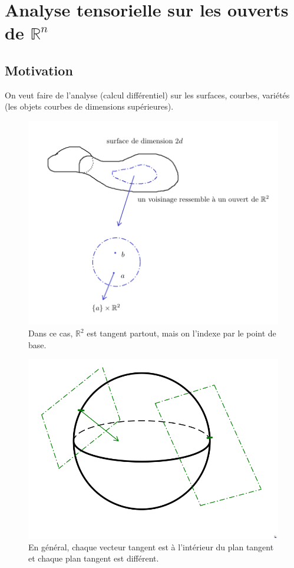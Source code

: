 \documentclass[french]{article}
\theoremstyle{definition}
\begin{document}
\section{Analyse tensorielle sur les ouverts de \(\mathbb{R}^n\)}

\subsection{Motivation}

On veut faire  de l'analyse (calcul différentiel) sur les surfaces, courbes, variétés (les objets courbes de dimensions supérieures).


\begin{figure}[h!]
  \centering
  \includegraphics[scale=0.3]{figures/motiv1-corr.png}
  \caption{Dans ce cas, \(\mathbb{R}^2\) est tangent partout, mais on l'indexe par le point de base. }
  \label{}
\end{figure}

\begin{figure}[h!]
  \centering
  \includegraphics[scale=0.2]{figures/motiv2.png}
  \caption{En général, chaque vecteur tangent est à l'intérieur du plan tangent et chaque plan tangent est différent.}
  \label{}
\end{figure}
\end{document}
